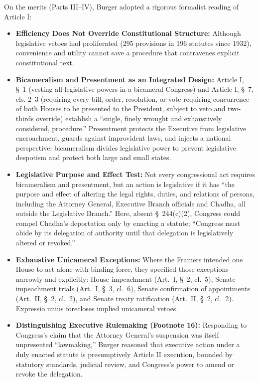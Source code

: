 \documentclass[12pt]{article}
\begin{document}
On the merits (Parts III--IV), Burger adopted a rigorous formalist reading of Article I:
\begin{itemize}
  \item \textbf{Efficiency Does Not Override Constitutional Structure:} Although legislative vetoes had proliferated (295 provisions in 196 statutes since 1932), convenience and utility cannot save a procedure that contravenes explicit constitutional text.
  \item \textbf{Bicameralism and Presentment as an Integrated Design:} Article I, \S~1 (vesting all legislative powers in a bicameral Congress) and Article I, \S~7, cls. 2--3 (requiring every bill, order, resolution, or vote requiring concurrence of both Houses to be presented to the President, subject to veto and two-thirds override) establish a ``single, finely wrought and exhaustively considered, procedure.'' Presentment protects the Executive from legislative encroachment, guards against improvident laws, and injects a national perspective; bicameralism divides legislative power to prevent legislative despotism and protect both large and small states.
  \item \textbf{Legislative Purpose and Effect Test:} Not every congressional act requires bicameralism and presentment, but an action is legislative if it has ``the purpose and effect of altering the legal rights, duties, and relations of persons, including the Attorney General, Executive Branch officials and Chadha, all outside the Legislative Branch.'' Here, absent \S~244(c)(2), Congress could compel Chadha's deportation only by enacting a statute; ``Congress must abide by its delegation of authority until that delegation is legislatively altered or revoked.''
  \item \textbf{Exhaustive Unicameral Exceptions:} Where the Framers intended one House to act alone with binding force, they specified those exceptions narrowly and explicitly: House impeachment (Art.~I, \S~2, cl.~5), Senate impeachment trials (Art.~I, \S~3, cl.~6), Senate confirmation of appointments (Art.~II, \S~2, cl.~2), and Senate treaty ratification (Art.~II, \S~2, cl.~2). Expressio unius forecloses implied unicameral vetoes.
  \item \textbf{Distinguishing Executive Rulemaking (Footnote 16):} Responding to Congress's claim that the Attorney General's suspension was itself unpresented ``lawmaking,'' Burger reasoned that executive action under a duly enacted statute is presumptively Article II execution, bounded by statutory standards, judicial review, and Congress's power to amend or revoke the delegation.
\end{itemize}
\end{document}
